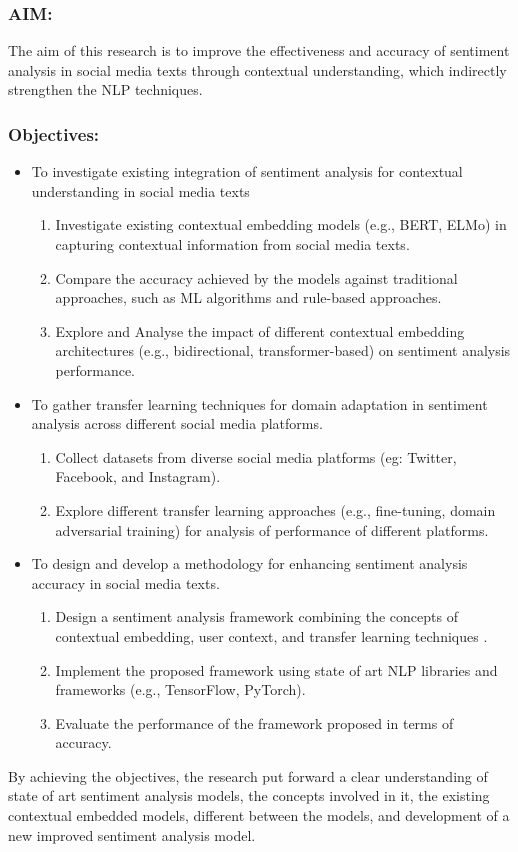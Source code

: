 \documentclass[a4paper,onecolumn,11pt]{article}
\begin{document}
\subsubsection{AIM: }
	The aim of this research is to improve the effectiveness and accuracy of sentiment analysis in social media texts through contextual understanding, which indirectly strengthen the NLP techniques.
\subsubsection{Objectives: }
\begin{itemize}
  \item{To investigate existing integration of sentiment analysis for contextual understanding in social media texts}
	\begin{enumerate}
	    \item{Investigate existing contextual embedding models (e.g., BERT, ELMo) in capturing contextual information from social media texts.}
	    \item{Compare the accuracy achieved by the models against traditional approaches, such as ML algorithms and rule-based approaches.}
	    \item{Explore and Analyse the impact of different contextual embedding architectures (e.g., bidirectional, transformer-based) on sentiment analysis performance.}
	\end{enumerate}
  \item{To gather transfer learning techniques for domain adaptation in sentiment analysis across different social media platforms.}
	\begin{enumerate}
	    \item{Collect datasets from diverse social media platforms (eg: Twitter, Facebook, and Instagram).}
	    \item{Explore different transfer learning approaches (e.g., fine-tuning, domain adversarial training) for analysis of performance of different platforms.}
	\end{enumerate}
  \item{To design and develop a methodology for enhancing sentiment analysis accuracy in social media texts.}
	\begin{enumerate}
	    \item{Design a sentiment analysis framework combining the concepts of contextual embedding, user context, and transfer learning techniques .}
	    \item{Implement the proposed framework using state of art NLP libraries and frameworks (e.g., TensorFlow, PyTorch).}
	    \item{Evaluate the performance of the framework proposed in terms of accuracy.}
	\end{enumerate}
\end{itemize}
By achieving the objectives, the research put forward a clear understanding of state of art sentiment analysis models, the concepts involved in it, the existing contextual embedded models, different between the models, and development of a new improved sentiment analysis model.
\end{document}
